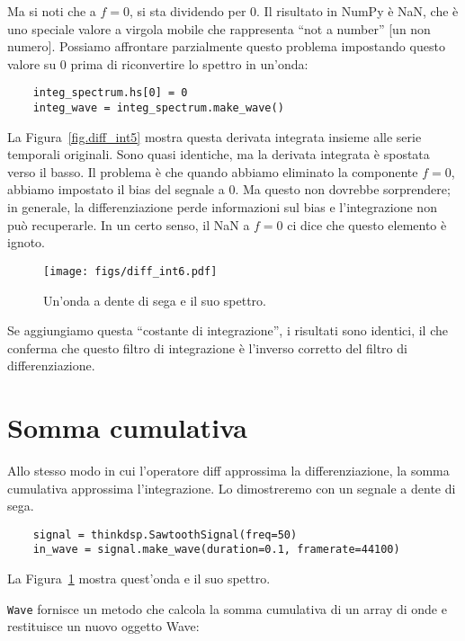 \documentclass[12pt,a4paper]{book}
\begin{document}
Ma si noti che a $f=0$, si sta dividendo per 0. Il risultato in NumPy è NaN, che è uno speciale valore a virgola mobile che rappresenta ``not a number'' [un non numero]. Possiamo affrontare parzialmente questo problema impostando questo valore su 0 prima di riconvertire lo spettro in un'onda:

\begin{verbatim} 
    integ_spectrum.hs[0] = 0
    integ_wave = integ_spectrum.make_wave()
 \end{verbatim} 

La Figura~\ref{fig.diff_int5} mostra questa derivata integrata insieme alle serie temporali originali. Sono quasi identiche, ma la derivata integrata è spostata verso il basso. Il problema è che quando abbiamo eliminato la componente $f=0$, abbiamo impostato il bias del segnale a 0. Ma questo non dovrebbe sorprendere; in generale, la differenziazione perde informazioni sul bias e l'integrazione non può recuperarle. In un certo senso, il NaN a $f=0$ ci dice che questo elemento è ignoto.

\begin{figure} 

\centerline{\texttt{[image: figs/diff\_int6.pdf]}} \caption{Un'onda a dente di sega e il suo spettro.} \label{fig.diff_int6} \end{figure} 

Se aggiungiamo questa ``costante di integrazione'', i risultati sono identici, il che conferma che questo filtro di integrazione è l'inverso corretto del filtro di differenziazione.

\section{Somma cumulativa} \label{cumsum} 

Allo stesso modo in cui l'operatore diff approssima la differenziazione, la somma cumulativa approssima l'integrazione. Lo dimostreremo con un segnale a dente di sega.

\begin{verbatim} 
    signal = thinkdsp.SawtoothSignal(freq=50)
    in_wave = signal.make_wave(duration=0.1, framerate=44100)
 \end{verbatim} 

La Figura~\ref{fig.diff_int6} mostra quest'onda e il suo spettro.

{\tt Wave} fornisce un metodo che calcola la somma cumulativa di un array di onde e restituisce un nuovo oggetto Wave:
\end{document}
